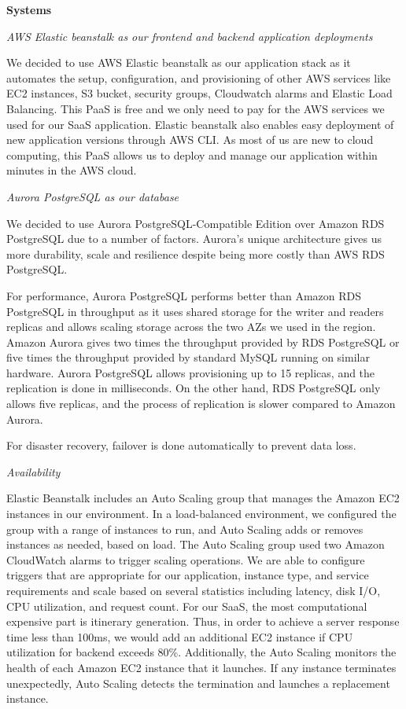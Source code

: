 \documentclass[12pt,a4paper]{article}
\begin{document}
            \textbf{Systems}
            
            \textit{AWS Elastic beanstalk as our frontend and backend application deployments}
            
            We decided to use AWS Elastic beanstalk as our application stack as it automates the setup, configuration, and provisioning of other AWS services like EC2 instances, S3 bucket, security groups, Cloudwatch alarms and Elastic Load Balancing. This PaaS is free and we only need to pay for the AWS services we used for our SaaS application. Elastic beanstalk also enables easy deployment of new application versions through AWS CLI. As most of us are new to cloud computing, this PaaS allows us to deploy and manage our application within minutes in the AWS cloud.
            
            \textit{Aurora PostgreSQL as our database}
            
            We decided to use Aurora PostgreSQL-Compatible Edition over Amazon RDS PostgreSQL due to a number of factors. Aurora's unique architecture gives us more durability, scale and resilience despite being more costly than AWS RDS PostgreSQL.

            For performance, Aurora PostgreSQL performs better than Amazon RDS PostgreSQL in throughput as it uses shared storage for the writer and readers replicas and allows scaling storage across the two AZs we used in the region. Amazon Aurora gives two times the throughput provided by RDS PostgreSQL or five times the throughput provided by standard MySQL running on similar hardware. Aurora PostgreSQL allows provisioning up to 15 replicas, and the replication is done in milliseconds. On the other hand, RDS PostgreSQL only allows five replicas, and the process of replication is slower compared to Amazon Aurora.
            
            For disaster recovery,  failover is done automatically to prevent data loss.
            
            \textit{Availability}
            
            Elastic Beanstalk includes an Auto Scaling group that manages the Amazon EC2 instances in our environment. In a load-balanced environment, we configured the group with a range of instances to run, and Auto Scaling adds or removes instances as needed, based on load. The Auto Scaling group used two Amazon CloudWatch alarms to trigger scaling operations. We are able to configure triggers that are appropriate for our application, instance type, and service requirements and scale based on several statistics including latency, disk I/O, CPU utilization, and request count. For our SaaS, the most computational expensive part is itinerary generation. Thus, in order to achieve a server response time less than 100ms, we would add an additional EC2 instance if CPU utilization for backend exceeds 80\%. Additionally, the Auto Scaling monitors the health of each Amazon EC2 instance that it launches. If any instance terminates unexpectedly, Auto Scaling detects the termination and launches a replacement instance.
\end{document}
